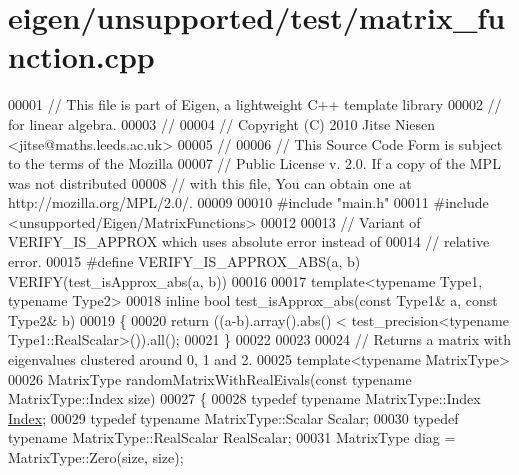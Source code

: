 \hypertarget{eigen_2unsupported_2test_2matrix__function_8cpp_source}{}\section{eigen/unsupported/test/matrix\+\_\+function.cpp}
\label{eigen_2unsupported_2test_2matrix__function_8cpp_source}

\begin{DoxyCode}
00001 \textcolor{comment}{// This file is part of Eigen, a lightweight C++ template library}
00002 \textcolor{comment}{// for linear algebra.}
00003 \textcolor{comment}{//}
00004 \textcolor{comment}{// Copyright (C) 2010 Jitse Niesen <jitse@maths.leeds.ac.uk>}
00005 \textcolor{comment}{//}
00006 \textcolor{comment}{// This Source Code Form is subject to the terms of the Mozilla}
00007 \textcolor{comment}{// Public License v. 2.0. If a copy of the MPL was not distributed}
00008 \textcolor{comment}{// with this file, You can obtain one at http://mozilla.org/MPL/2.0/.}
00009 
00010 \textcolor{preprocessor}{#include "main.h"}
00011 \textcolor{preprocessor}{#include <unsupported/Eigen/MatrixFunctions>}
00012 
00013 \textcolor{comment}{// Variant of VERIFY\_IS\_APPROX which uses absolute error instead of}
00014 \textcolor{comment}{// relative error.}
00015 \textcolor{preprocessor}{#define VERIFY\_IS\_APPROX\_ABS(a, b) VERIFY(test\_isApprox\_abs(a, b))}
00016 
00017 \textcolor{keyword}{template}<\textcolor{keyword}{typename} Type1, \textcolor{keyword}{typename} Type2>
00018 \textcolor{keyword}{inline} \textcolor{keywordtype}{bool} test\_isApprox\_abs(\textcolor{keyword}{const} Type1& a, \textcolor{keyword}{const} Type2& b)
00019 \{
00020   \textcolor{keywordflow}{return} ((a-b).array().abs() < test\_precision<typename Type1::RealScalar>()).all();
00021 \}
00022 
00023 
00024 \textcolor{comment}{// Returns a matrix with eigenvalues clustered around 0, 1 and 2.}
00025 \textcolor{keyword}{template}<\textcolor{keyword}{typename} MatrixType>
00026 MatrixType randomMatrixWithRealEivals(\textcolor{keyword}{const} \textcolor{keyword}{typename} MatrixType::Index size)
00027 \{
00028   \textcolor{keyword}{typedef} \textcolor{keyword}{typename} MatrixType::Index \hyperlink{namespace_eigen_a62e77e0933482dafde8fe197d9a2cfde}{Index};
00029   \textcolor{keyword}{typedef} \textcolor{keyword}{typename} MatrixType::Scalar Scalar;
00030   \textcolor{keyword}{typedef} \textcolor{keyword}{typename} MatrixType::RealScalar RealScalar;
00031   MatrixType diag = MatrixType::Zero(size, size);

\end{DoxyCode}
